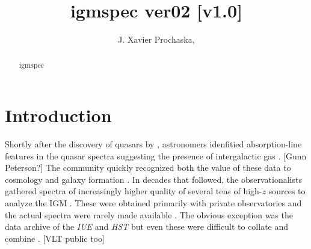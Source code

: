 \documentclass[12pt,preprint]{aastex}
\begin{document}
\def \lzlls {$\ell_{\rm{LLS}}(z)$}
\def \mllls {\ell_{\rm{LLS}}(X)}
\def \llls {$\ell_{\rm{LLS}}(X)$}
\def \ldla {$\ell_{\rm{DLA}}(X)$}
\def \lslls{$\ell_{\rm{SLLS}}(X)$}
\def \mlslls{\ell_{\rm{SLLS}}(X)}
\def \nlls {$n_{\rm LLS}$}
\def \slls {$\sigma_{\rm LLS}$}
\def \mnlls {n_{\rm LLS}}
\def \mslls {\sigma_{\rm LLS}}
\def \drlls {$\Delta r_{\rm LLS}$}
\def \mdrlls {\Delta r_{\rm LLS}}
\def \mlmfp {\lambda_{\rm mfp}^{912}}
\def \lmfp {$\lambda_{\rm mfp}^{912}$}
\def \mbplls {\beta_{\rm pLLS}}
\def \bplls {$\beta_{\rm pLLS}$}
\def \btlls {$\beta_{\rm LLS}$}
\def \mbtlls {\beta_{\rm LLS}}
\def \lteff {$\tau_{\rm eff,LL}$}
\def \teff {$\tau_{\rm eff,LL}$}
\def \tlya {$\tau_{\rm eff}^{\rm Ly\alpha}$}
\def \mtlya {\tau_{\rm eff}^{\rm Ly\alpha}}
\def \mteff {\tau_{\rm eff}}
\def \mllteff {\mteff^{912}}
\def \llteff {$\mteff^{912}$}
\def \mnmin {\mnhi^{\rm min}}
\def \nmin {$\mnhi^{\rm min}$}
\def \O {${\mathcal O}(N,X)$}
\newcommand{\cm}[1]{\, {\rm cm^{#1}}}
\def\N#1{{N({\rm #1})}}
\def\psol#1#2#3#4{$\{ {\rm #1}^{#2}/{\rm #3}^{#4}\}$}
\def\pxh{$\{ {\rm X/H} \}$}
\def \snrlim {SNR$_{lim}$}
\def\mglls {\gamma_{\rm LLS}}
\def\mavgt {<\mtll>}

\title{igmspec ver02 
[v1.0]}

\author{
J. Xavier Prochaska, 
}

\begin{abstract}
igmspec 
\end{abstract}



\section{Introduction}
\label{sec:intro}

Shortly after the discovery of quasars by \cite{schmidt6X},
astronomers idenfitied absorption-line features in the quasar
spectra suggesting the presence of intergalactic gas
\citep{burbidge,bahcall}.  [Gunn Peterson?]
The community quickly recognized both the value of these
data to cosmology and galaxy formation \cite{bahcall,spitzer}.
In decades that followed, the observationalists gathered
spectra of increasingly higher quality of several tens of
high-$z$ sources to analyze the IGM 
\citep{sargent,young,tytler,wolfe,lanzetta,bergeron}.
These were obtained primarily with private observatories and
the actual spectra were rarely made available
\citep[see][for a few exceptions]{dodorico_hdf}.
The obvious exception was the data archive of the
{\it IUE} and {\it HST} but even these were difficult to 
collate and combine \citep{jannuzi,bechtold}.
[VLT public too]
\end{document}
